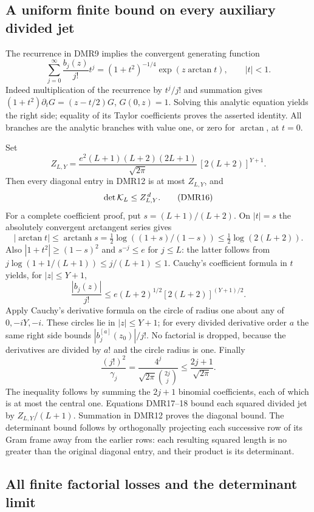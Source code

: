 \documentclass[11pt,a4paper]{article}
\begin{document}
\subsection{A uniform finite bound on every auxiliary divided jet}

The recurrence in DMR9 implies the convergent generating function
\[
 \sum_{j=0}^\infty \frac{b_j(z)}{j!}t^j
       =(1+t^2)^{-1/4}\exp(z\arctan t),\qquad |t|<1.
 \tag{DMR14}
\]
Indeed multiplication of the recurrence by $t^j/j!$ and summation
gives $(1+t^2)\partial_t G=(z-t/2)G$, $G(0,z)=1$.
Solving this analytic equation yields the right side; equality
of its Taylor coefficients proves the asserted identity.
All branches are the analytic branches with value one, or zero
for $\arctan$, at $t=0$.

Set
\[
 Z_{L,Y}=\frac{e^2(L+1)(L+2)(2L+1)}{\sqrt{2\pi}}\,
                  [2(L+2)]^{Y+1}.
 \tag{DMR15}
\]
Then every diagonal entry in DMR12 is at most $Z_{L,Y}$, and
\[
 \det{\cal K}_L\leq Z_{L,Y}^{\,d}.
 \tag{DMR16}
\]
For a complete coefficient proof, put $s=(L+1)/(L+2)$.
On $|t|=s$ the absolutely convergent arctangent series gives
\[
 |\arctan t|\leq\operatorname{arctanh}s
 =\tfrac12\log((1+s)/(1-s))
 \leq\tfrac12\log(2(L+2)).
\]
Also $|1+t^2|\geq(1-s)^2$ and $s^{-j}\leq e$ for $j\leq L$:
the latter follows from
$j\log(1+1/(L+1))\leq j/(L+1)\leq1$.
Cauchy's coefficient formula in $t$ yields, for $|z|\leq Y+1$,
\[
 \frac{|b_j(z)|}{j!}
 \leq e(L+2)^{1/2}[2(L+2)]^{(Y+1)/2}.
 \tag{DMR17}
\]
Apply Cauchy's derivative formula on the circle of radius one
about any of $0,-iY,-i$. These circles lie in $|z|\leq Y+1$;
for every divided derivative order $a$ the same right side
bounds $|b_j^{[a]}(z_0)|/j!$. No factorial is dropped, because
the derivatives are divided by $a!$ and the circle radius is one.
Finally
\[
 \frac{(j!)^2}{\gamma_j}
 =\frac{4^j}{\sqrt{2\pi}\binom{2j}{j}}
 \leq\frac{2j+1}{\sqrt{2\pi}} .
 \tag{DMR18}
\]
The inequality follows by summing the $2j+1$ binomial coefficients,
each of which is at most the central one. Equations DMR17--18
bound each squared divided jet by $Z_{L,Y}/(L+1)$.
Summation in DMR12 proves the diagonal bound. The determinant
bound follows by orthogonally projecting each successive row
of its Gram frame away from the earlier rows: each resulting
squared length is no greater than the original diagonal
entry, and their product is its determinant.

\subsection{All finite factorial losses and the determinant limit}
\end{document}
